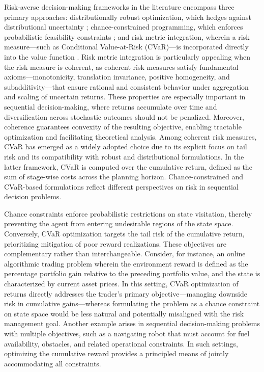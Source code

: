 \documentclass[acmlarge, manuscript, screen, review, natbib=false, oneside]{acmart}
\begin{document}
Risk-averse decision-making frameworks in the literature encompass three primary approaches: distributionally robust optimization, which hedges against distributional uncertainty \cite{xu2010distributionally}; chance-constrained programming, which enforces probabilistic feasibility constraints \cite{santana2016aaai, moss2024constrainedzero}; and risk metric integration, wherein a risk measure—such as Conditional Value-at-Risk (CVaR)—is incorporated directly into the value function \cite{chow2015risk}. 
%
Risk metric integration is particularly appealing when the risk measure is coherent, as coherent risk measures satisfy fundamental axioms—monotonicity, translation invariance, positive homogeneity, and subadditivity—that ensure rational and consistent behavior under aggregation and scaling of uncertain returns. These properties are especially important in sequential decision-making, where returns accumulate over time and diversification across stochastic outcomes should not be penalized. Moreover, coherence guarantees convexity of the resulting objective, enabling tractable optimization and facilitating theoretical analysis. Among coherent risk measures, CVaR has emerged as a widely adopted choice due to its explicit focus on tail risk and its compatibility with robust and distributional formulations.
In the latter framework, CVaR is computed over the cumulative return, defined as the sum of stage-wise costs across the planning horizon. 
Chance-constrained and CVaR-based formulations reflect different perspectives on risk in sequential decision problems. 

Chance constraints enforce probabilistic restrictions on state visitation, thereby preventing the agent from entering undesirable regions of the state space. Conversely, CVaR optimization targets the tail risk of the cumulative return, prioritizing mitigation of poor reward realizations. These objectives are complementary rather than interchangeable. Consider, for instance, an online algorithmic trading problem wherein the environment reward is defined as the percentage portfolio gain relative to the preceding portfolio value, and the state is characterized by current asset prices. In this setting, CVaR optimization of returns directly addresses the trader's primary objective—managing downside risk in cumulative gains—whereas formulating the problem as a chance constraint on state space would be less natural and potentially misaligned with the risk management goal. Another example arises in sequential decision-making problems with multiple objectives, such as a navigating robot that must account for fuel availability, obstacles, and related operational constraints. In such settings, optimizing the cumulative reward provides a principled means of jointly accommodating all constraints.
\end{document}
